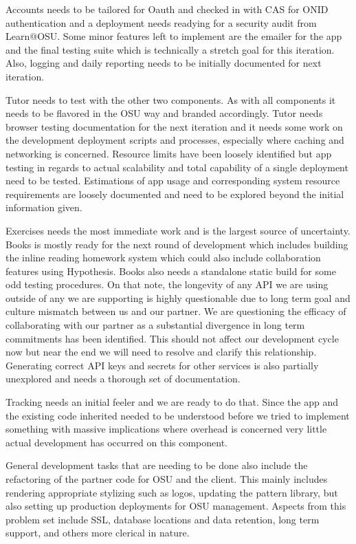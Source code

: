 \documentclass[onecolumn, draftclsnofoot,10pt, compsoc]{IEEEtran}
\begin{document}
Accounts needs to be tailored for Oauth and checked in with CAS for ONID authentication and a deployment needs readying for a security audit from Learn@OSU. Some minor features left to implement are the emailer for the app and the final testing suite which is technically a stretch goal for this iteration. Also, logging and daily reporting needs to be initially documented for next iteration. 

Tutor needs to test with the other two components. As with all components it needs to be flavored in the OSU way and branded accordingly. Tutor needs browser testing documentation for the next iteration and it needs some work on the development deployment scripts and processes, especially where caching and networking is concerned. Resource limits have been loosely identified but app testing in regards to actual scalability and total capability of a single deployment need to be tested. Estimations of app usage and corresponding system resource requirements are loosely documented and need to be explored beyond the initial information given. 

Exercises needs the most immediate work and is the largest source of uncertainty. Books is mostly ready for the next round of development which includes building the inline reading homework system which could also include collaboration features using Hypothesis. Books also needs a standalone static build for some odd testing procedures. On that note, the longevity of any API we are using outside of any we are supporting is highly questionable due to long term goal and culture mismatch between us and our partner. We are questioning the efficacy of collaborating with our partner as a substantial divergence in long term commitments has been identified. This should not affect our development cycle now but near the end we will need to resolve and clarify this relationship. Generating correct API keys and secrets for other services is also partially unexplored and needs a thorough set of documentation.  

Tracking needs an initial feeler and we are ready to do that. Since the app and the existing code inherited needed to be understood before we tried to implement something with massive implications where overhead is concerned very little actual development has occurred on this component.  

General development tasks that are needing to be done also include the refactoring of the partner code for OSU and the client. This mainly includes rendering appropriate stylizing such as logos, updating the pattern library, but also setting up production deployments for OSU management. Aspects from this problem set include SSL, database locations and data retention, long term support, and others more clerical in nature.
\end{document}
